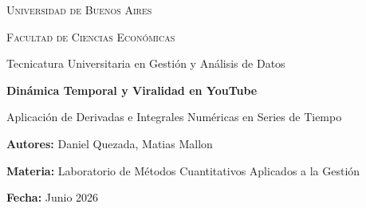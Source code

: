 \documentclass[12pt,a4paper]{article}
\begin{document}
\begin{titlepage}
    \centering
    \vspace*{1cm}
    
    {\scshape\LARGE Universidad de Buenos Aires \par}
    \vspace{1cm}
    {\scshape\Large Facultad de Ciencias Económicas\par}
    \vspace{0.2cm}
    {\large Tecnicatura Universitaria en Gestión y Análisis de Datos\par}
    
    \vspace{2cm}
    
    {\Huge\bfseries Dinámica Temporal y Viralidad en YouTube\par}
    \vspace{0.5cm}
    {\Large Aplicación de Derivadas e Integrales Numéricas en Series de Tiempo\par}
    
    \vspace{9cm}
    
    \begin{flushleft}
    {\large \textbf{Autores:} Daniel Quezada, Matias Mallon\par}
    \vspace{0.2cm}
    {\large \textbf{Materia:} Laboratorio de Métodos Cuantitativos Aplicados a la Gestión\par}
    \vspace{0.2cm}
    {\large \textbf{Fecha:} Junio 2026\par}
    \end{flushleft}
\end{titlepage}

\begin{abstract}
\noindent El presente trabajo investiga la dinámica temporal de los videos virales en YouTube mediante la aplicación de derivadas e integrales numéricas sobre series de tiempo. Utilizando un conjunto de datos filtrado de las tendencias de YouTube en seis países, se analizaron los ciclos de vida de los contenidos de mayor alcance. Los resultados demuestran que la viralidad global opera bajo ciclos ultracortos: los videos alcanzan su máxima velocidad de propagación (peak) en una mediana de dos días desde su ingreso al ranking, seguidos de un decaimiento gradual. Adicionalmente, contrario a la hipótesis inicial, la inercia del canal emisor no se asocia con un mayor alcance mediano: las medianas resultan notablemente similares entre canales establecidos y emergentes dentro del top 50 por país, lo cual sugiere que el filtro de éxito propio del ranking equipara ambas categorías. La concentración geográfica del mercado emerge como un factor más determinante que el tamaño demográfico absoluto.
\end{abstract}
\end{document}
